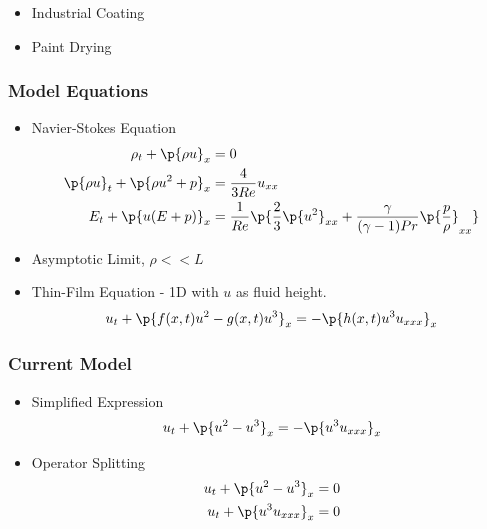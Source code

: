 \documentclass[10pt]{beamer}
\begin{document}
\begin{frame}
\begin{center}
      \end{center}
      \begin{itemize}
        \item Industrial Coating
        \item Paint Drying
      \end{itemize}
    \end{frame}

    \begin{frame}
      \frametitle{Model Equations}
      \begin{itemize}
        \item Navier-Stokes Equation
          \begin{align*}
            \rho_t + \p{\rho u}_x &= 0 \\
            \p{\rho u}_t + \p{\rho u^2 + p}_x &=  \frac{4}{3Re} u_{xx} \\
            E_t + \p{u (E + p)}_x &= \frac{1}{Re} \p{\frac{2}{3} \p{u^2}_{xx} + \frac{\gamma}{(\gamma - 1)Pr} \p{\frac{p}{\rho}}_{xx}}
          \end{align*}
        \item Asymptotic Limit, $\rho << L$
        \item Thin-Film Equation - 1D with $u$ as fluid height.
          \[
            u_t + \p{f(x, t) u^2 - g(x, t) u^3}_x = -\p{h(x, t) u^3 u_{xxx}}_x
          \]
      \end{itemize}
    \end{frame}

    \begin{frame}
      \frametitle{Current Model}
      \begin{itemize}
        \item Simplified Expression
          \[
            u_t + \p{u^2 - u^3}_x = -\p{u^3 u_{xxx}}_x
          \]

        \item Operator Splitting
          \begin{align*}
            u_t + \p{u^2 - u^3}_x &= 0 \\
            u_t + \p{u^3 u_{xxx}}_x &= 0
          \end{align*}
      \end{itemize}
    \end{frame}
\end{document}
